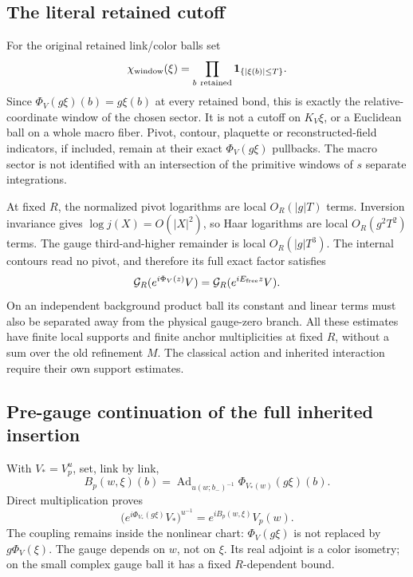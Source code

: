 \documentclass[11pt]{article}
\theoremstyle{remark}
\begin{document}
\subsection{The literal retained cutoff}
\label{cmi-window-section}

For the original retained link/color balls set
\[
 \chi_{\rm window}(\xi)=
 \prod_{b\ {\rm retained}}\mathbf1_{\{|\xi(b)|\le T\}}.
\]
Since $\Phi_V(g\xi)(b)=g\xi(b)$ at every retained bond,
this is exactly the relative-coordinate window of the
chosen sector. It is not a cutoff on $K_V\xi$, or a
Euclidean ball on a whole macro fiber. Pivot, contour,
plaquette or reconstructed-field indicators, if included,
remain at their exact $\Phi_V(g\xi)$ pullbacks.
The macro sector is not identified with an intersection
of the primitive windows of $s$ separate integrations.

At fixed $R$, the normalized pivot logarithms are local
$O_R(|g|T)$ terms. Inversion invariance gives
$\log j(X)=O(|X|^2)$, so Haar logarithms are local
$O_R(g^2T^2)$ terms. The gauge third-and-higher remainder
is local $O_R(|g|T^3)$. The internal contours read no pivot,
and therefore its full exact factor satisfies
\begin{equation}\label{cmi-gauge-retained}
 \mathcal G_R(e^{i\Phi_V(z)}V)
       =\mathcal G_R(e^{iE_{\rm free}z}V).
\end{equation}
On an independent background product ball its constant
and linear terms must also be separated away from the
physical gauge-zero branch. All these estimates have
finite local supports and finite anchor multiplicities
at fixed $R$, without a sum over the old refinement $M$.
The classical action and inherited interaction require
their own support estimates.

\subsection{Pre-gauge continuation of the full inherited insertion}
\label{cmi-continuation-section}

With $V_*=V_p^u$, set, link by link,
\begin{equation}\label{cmi-prefluctuation}
 B_p(w,\xi)(b)=
   \operatorname{Ad}_{u(w;b_-)^{-1}}
                  \Phi_{V_*(w)}(g\xi)(b).
\end{equation}
Direct multiplication proves
\begin{equation}\label{cmi-fluctuation-identity}
 \bigl(e^{i\Phi_{V_*}(g\xi)}V_*\bigr)^{u^{-1}}
             =e^{iB_p(w,\xi)}V_p(w).
\end{equation}
The coupling remains inside the nonlinear chart:
$\Phi_V(g\xi)$ is not replaced by $g\Phi_V(\xi)$.
The gauge depends on $w$, not on $\xi$. Its real adjoint
is a color isometry; on the small complex gauge ball it
has a fixed $R$-dependent bound.
\end{document}
